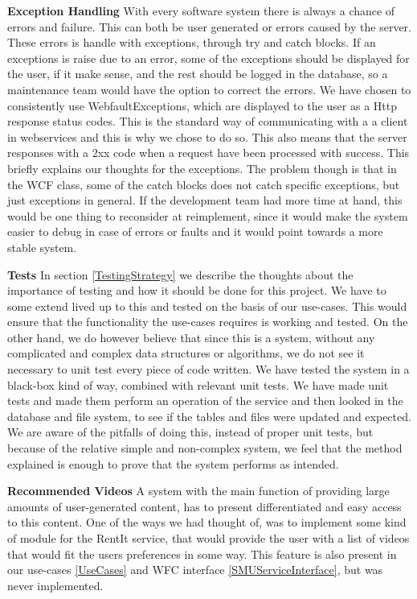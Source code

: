 \textbf{Exception Handling}
With every software system there is always a chance of errors and failure. This can both be user generated or errors caused by the server. These errors is handle with exceptions, through try and catch blocks. If an exceptions is raise due to an error, some of the exceptions should be displayed for the user, if it make sense, and the rest should be logged in the database, so a maintenance team would have the option to correct the errors. We have chosen to consistently use WebfaultExceptions, which are displayed to the user as a Http response status codes. This is the standard way of communicating with a a client in webservices and this is why we chose to do so. This also means that the server responses with a 2xx code when a request have been processed with success. This briefly explains our thoughts for the exceptions. The problem though is that in the WCF class, some of the catch blocks does not catch specific exceptions, but just exceptions in general. If the development team had more time at hand, this would be one thing to reconsider at reimplement, since it would make the system easier to debug in case of errors or faults and it would point towards a more stable system.  
 
\textbf{Tests}
In section \ref{TestingStrategy} we describe the thoughts about the importance of testing and how it should be done for this project. We have to some extend lived up to this and tested on the basis of our use-cases. This would ensure that the functionality the use-cases requires is working and tested. On the other hand, we do however believe that since this is a system, without any complicated and complex data structures or algorithms, we do not see it necessary to unit test every piece of code written. We have tested the system in a black-box kind of way, combined with relevant unit tests. We have made unit tests and made them perform an operation of the service and then looked in the database and file system, to see if the tables and files were updated and expected. We are aware of the pitfalls of doing this, instead of proper unit tests, but because of the relative simple and non-complex system, we feel that the method explained is enough to prove that the system performs as intended.

\textbf{Recommended Videos}
A system with the main function of providing large amounts of user-generated content, has to present differentiated and easy access to this content. One of the ways we had thought of, was to implement some kind of module for the RentIt service, that would provide the user with a list of videos that would fit the users preferences in some way. This feature is also present in our use-cases \ref{UseCases} and WFC interface \ref{SMUServiceInterface}, but was never implemented.

